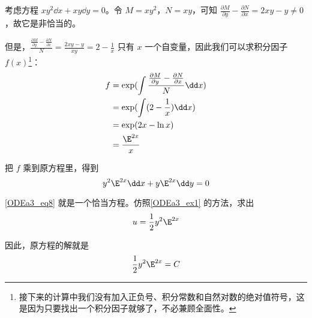 \begin{example}{}
考虑方程 $xy^2\dd x+xy\dd y=0$。令 $M=xy^2$，$N=xy$，可知 $\frac{\partial M}{\partial y}-\frac{\partial N}{\partial x}=2xy-y\not=0$，故它是非恰当的。

但是，$\frac{\frac{\partial M}{\partial y}-\frac{\partial N}{\partial x}}{N}=\frac{2xy-y}{xy}=2-\frac{1}{x}$ 只有 $x$ 一个自变量，因此我们可以求积分因子 $f(x)$\footnote{接下来的计算中我们没有加入正负号、积分常数和自然对数的绝对值符号，这是因为只要找出一个积分因子就够了，不必兼顾全面性。}：
\begin{equation}
\begin{aligned}
f&=\exp(\int \frac{\frac{\partial M}{\partial y}-\frac{\partial N}{\partial x}}{N}\dd x)\\
&=\exp(\int(2-\frac{1}{x})\dd x)\\
&=\exp(2x-\ln x)\\
&=\frac{\E^{2x}}{x}
\end{aligned}
\end{equation}

把 $f$ 乘到原方程里，得到
\begin{equation}\label{ODEa3_eq8}
y^2\E^{2x}\dd x+y\E^{2x}\dd y=0
\end{equation}

\autoref{ODEa3_eq8} 就是一个恰当方程。仿照\autoref{ODEa3_ex1} 的方法，求出
\begin{equation}
u=\frac{1}{2}y^2\E^{2x}
\end{equation}

因此，原方程的解就是
\begin{equation}
\frac{1}{2}y^2\E^{2x}=C
\end{equation}



\end{example}





